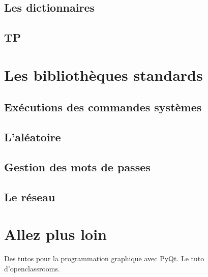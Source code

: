 \documentclass[12pt]{article}
\begin{document}
    \subsection{Les dictionnaires}
    \subsection{TP}

\section{Les bibliothèques standards}
    \subsection{Exécutions des commandes systèmes}
    \subsection{L'aléatoire}
    \subsection{Gestion des mots de passes}
    \subsection{Le réseau}

\section{Allez plus loin}
    Des tutos pour la programmation graphique avec PyQt. Le tuto d'openclassrooms.
\end{document}
